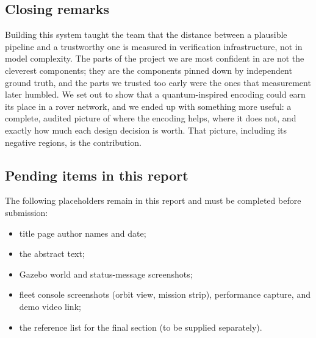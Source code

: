 \subsection{Closing remarks}

Building this system taught the team that the distance between a plausible
pipeline and a trustworthy one is measured in verification infrastructure,
not in model complexity. The parts of the project we are most confident in
are not the cleverest components; they are the components pinned down by
independent ground truth, and the parts we trusted too early were the ones
that measurement later humbled. We set out to show that a quantum-inspired
encoding could earn its place in a rover network, and we ended up with
something more useful: a complete, audited picture of where the encoding
helps, where it does not, and exactly how much each design decision is
worth. That picture, including its negative regions, is the contribution.

\subsection{Pending items in this report}

The following placeholders remain in this report and must be completed before submission:

\begin{itemize}
  \item title page author names and date;
  \item the abstract text;
  \item Gazebo world and status-message screenshots;
  \item fleet console screenshots (orbit view, mission strip), performance capture, and demo video link;
  \item the reference list for the final section (to be supplied separately).
\end{itemize}
